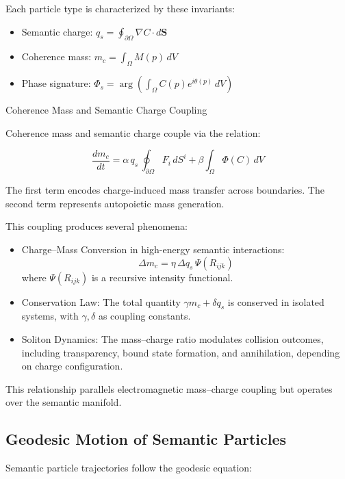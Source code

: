 Each particle type is characterized by these invariants:
\begin{itemize}
    \item Semantic charge: \(q_s = \oint_{\partial \Omega} \nabla C \cdot d\mathbf{S}\)
    \item Coherence mass: \(m_c = \int_{\Omega} M(p)\, dV\)
    \item Phase signature: \(\Phi_s = \arg\left(\int_{\Omega} C(p) e^{i\theta(p)}\, dV\right)\)
\end{itemize}

Coherence Mass and Semantic Charge Coupling

Coherence mass and semantic charge couple via the relation:

\begin{equation}
\frac{dm_c}{dt} = \alpha\, q_s\, \oint_{\partial \Omega} F_i\, dS^i + \beta \int_{\Omega} \Phi(C)\, dV
\end{equation}

The first term encodes charge-induced mass transfer across boundaries. The second term represents autopoietic mass generation.

This coupling produces several phenomena:

\begin{itemize}
    \item Charge–Mass Conversion in high-energy semantic interactions:
    \begin{equation}
    \Delta m_c = \eta\, \Delta q_s\, \Psi(R_{ijk})
    \end{equation}
    where \(\Psi(R_{ijk})\) is a recursive intensity functional.
    \item Conservation Law: The total quantity \(\gamma m_c + \delta q_s\) is conserved in isolated systems, with \(\gamma, \delta\) as coupling constants.
    \item Soliton Dynamics: The mass–charge ratio modulates collision outcomes, including transparency, bound state formation, and annihilation, depending on charge configuration.
\end{itemize}

This relationship parallels electromagnetic mass–charge coupling but operates over the semantic manifold.

\subsection{Geodesic Motion of Semantic Particles}

Semantic particle trajectories follow the geodesic equation:

